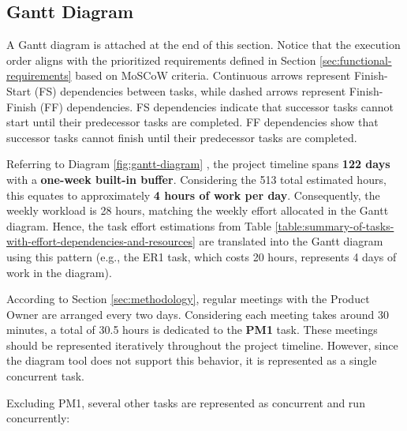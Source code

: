 \subsection{Gantt Diagram}
\label{sec:gantt-diagram}

A Gantt diagram is attached at the end of this section. Notice that the execution order aligns with the prioritized requirements defined in Section \ref{sec:functional-requirements} based on MoSCoW criteria. Continuous arrows represent Finish-Start (FS) dependencies between tasks, while dashed arrows represent Finish-Finish (FF) dependencies. FS dependencies indicate that successor tasks cannot start until their predecessor tasks are completed. FF dependencies show that successor tasks cannot finish until their predecessor tasks are completed.

Referring to Diagram \ref{fig:gantt-diagram} , the project timeline spans \textbf{122 days} with a \textbf{one-week built-in buffer}. Considering the 513 total estimated hours, this equates to approximately \textbf{4 hours of work per day}. Consequently, the weekly workload is 28 hours, matching the weekly effort allocated in the Gantt diagram. Hence, the task effort estimations from Table \ref{table:summary-of-tasks-with-effort-dependencies-and-resources} are translated into the Gantt diagram using this pattern (e.g., the ER1 task, which costs 20 hours, represents 4 days of work in the diagram).

According to Section \ref{sec:methodology}, regular meetings with the Product Owner are arranged every two days. Considering each meeting takes around 30 minutes, a total of 30.5 hours is dedicated to the \textbf{PM1} task. These meetings should be represented iteratively throughout the project timeline. However, since the diagram tool does not support this behavior, it is represented as a single concurrent task. 


Excluding PM1, several other tasks are represented as concurrent and run concurrently:

